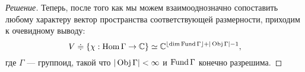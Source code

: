 \begin{proof}[Решение]
    Теперь, после того как мы можем взаимооднозначно сопоставить любому 
    характеру вектор пространства соответствующей размерности, приходим к 
    очевидному выводу: 
    \begin{equation}
        V \doteqdot \{\chi: \operatorname*{Hom} \Gamma \to \mathbb{C}\} \simeq 
        \mathbb{C}^{\lfloor \dim \operatorname*{Fund} \Gamma \rfloor + |\operatorname*{Obj} \Gamma| - 1},
    \end{equation}
    где $\Gamma$ --- группоид, такой что $|\operatorname*{Obj} \Gamma| < \infty$ и 
    $\operatorname*{Fund} \Gamma$ конечно разрешима.



    






\end{proof}
